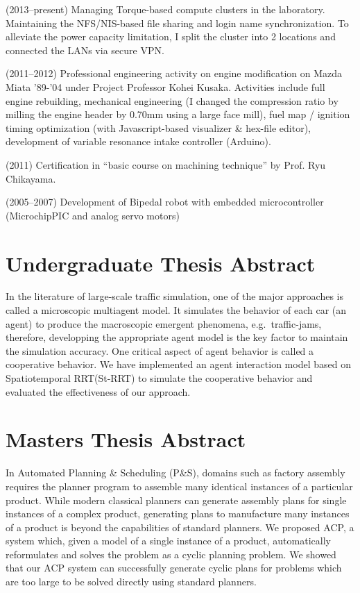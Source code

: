 \documentclass[letterpaper]{article}
\begin{document}
(2013--present) Managing Torque-based compute clusters in the laboratory. Maintaining
the NFS/NIS-based file sharing and login name synchronization. To
alleviate the power capacity limitation, I split the cluster into 2
locations and connected the LANs via secure VPN.

(2011--2012) Professional engineering activity on engine modification on
Mazda Miata '89-'04 under Project Professor Kohei Kusaka. Activities
include full engine rebuilding, mechanical engineering (I changed the
compression ratio by milling the engine header by 0.70mm using a large
face mill), fuel map / ignition timing optimization (with
Javascript-based visualizer \& hex-file editor), development of
variable resonance intake controller (Arduino).

(2011) Certification in ``basic course on machining technique'' by Prof. Ryu Chikayama.

(2005--2007) Development of Bipedal robot with embedded microcontroller
(Microchip\textregistered PIC and analog servo motors)


\section{Undergraduate Thesis Abstract}

{\small
In the literature of large-scale traffic simulation,
one of the major approaches is called a microscopic multiagent model.
It simulates the behavior of each car (an agent)
to produce the macroscopic emergent phenomena, e.g.\  traffic-jams,
therefore, developping the appropriate agent model is the key
factor to maintain the simulation accuracy.  One critical aspect of
agent behavior is called a cooperative behavior. We have implemented an agent
interaction model based on Spatiotemporal RRT(St-RRT) to
simulate the cooperative behavior and evaluated the
effectiveness of our approach.
}

\section{Masters Thesis Abstract}

{\small
In Automated Planning \& Scheduling (P\&S),
domains such as factory assembly requires the planner program to
assemble many identical instances of a particular product.  While modern classical
planners can generate assembly plans for single instances of a complex
product, generating plans to manufacture many instances of a product is
beyond the capabilities of standard planners. We proposed ACP, a system
which, given a model of a single instance of a product, automatically
reformulates and solves the problem as a cyclic planning problem.  We
showed that our ACP system can successfully generate
cyclic plans for problems which are too large to be solved directly
using standard planners.
}
\end{document}
